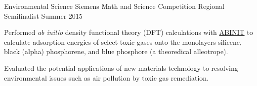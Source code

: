 
\begin{cventries}

  \cventry
    {Environmental Science} %
    {Siemens Math and Science Competition} %
    {Regional Semifinalist} %
    {Summer 2015} %
    {
      \begin{cvitems}
        \item{Performed \textit{ab initio} density functional theory (DFT) calculations with \href{https://abinit.org}{ABINIT} to calculate adsorption energies of select toxic gases onto the monolayers silicene, black (alpha) phosphorene, and blue phosphore (a theoredical alleotrope).}
        \item{Evaluated the potential applications of new materials technology to resolving environmental issues such as air pollution by toxic gas remediation.}
      \end{cvitems}
    }

\end{cventries}
